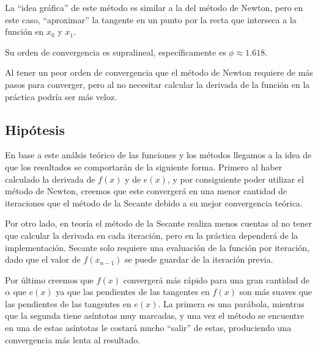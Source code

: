 La ``idea gráfica'' de este método es similar a la del método de Newton, pero en
este caso, ``aproximar'' la tangente en un punto por la recta que interseca a la
función en $x_0$ y $x_1$.

Su orden de convergencia es supralineal, específicamente es $\phi \approx
1.618$.

Al tener un peor orden de convergencia que el método de Newton requiere de más
pasos para converger, pero al no necesitar calcular la derivada de la función
en la práctica podría ser más veloz.

\subsection{Hipótesis}

En base a este análsis teórico de las funciones y los métodos llegamos a la
idea de que los resultados se comportarán de la siguiente forma. Primero al
haber calculado la derivada de $f(x)$ y de $e(x)$, y por consiguiente poder
utilizar el método de Newton, creemos que este convergerá en una menor cantidad
de iteraciones que el método de la Secante debido a su mejor convergencia
teórica.

Por otro lado, en teoría el método de la Secante realiza menos cuentas al no
tener que calcular la derivada en cada iteración, pero en la práctica dependerá
de la implementación. Secante solo requiere una evaluación de la función por
iteración, dado que el valor de $f(x_{n - 1})$ se puede guardar de la iteración
previa.

Por último creemos que $f(x)$ convergerá más rápido para una gran cantidad de
$\alpha$ que $e(x)$ ya que las pendientes de las tangentes en $f(x)$ son más
suaves que las pendientes de las tangentes en $e(x)$. La primera es una
parábola, mientras que la segunda tiene asíntotas muy marcadas, y una vez el
método se encuentre en una de estas asíntotas le costará mucho ``salir'' de
estas, produciendo una convergencia más lenta al resultado.
